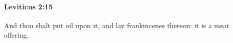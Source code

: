 
		\paragraph{Leviticus 2:15} %
			\label{LEVITICUS-2-15}

			And thou shalt put oil upon it, and lay frankincense thereon: it is a meat offering.


